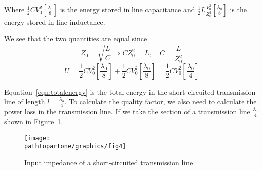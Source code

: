 Where $\frac{1}{2}CV_0^{2}\left[\frac{\lambda_{0}}{8}\right] $ is the energy stored in line capacitance and $ \frac{1}{2}L\frac{V_0^{2}}{Z_0^{2}}\left[ \frac{\lambda_{0}}{8} \right] $ is the energy stored in line inductance.

We see that the two quantities are equal since
\begin{equation*}
Z_0 = \sqrt{\frac{L}{C}}\Longrightarrow CZ_0^{2} = L,\quad C = \frac{L}{Z_0^{2}}
\end{equation*}
\begin{dmath}
U = \frac{1}{2}CV_0^{2}\left[\frac{\lambda_{0}}{8}\right] +\frac{1}{2}CV_0^{2}\left[\frac{\lambda_{0}}{8}\right]
= \frac{1}{2}CV_0^{2}\left[\frac{\lambda_{0}}{4}\right]
\label{eqn:totalenergy}
\end{dmath}

Equation~\eqref{eqn:totalenergy} is the total energy in the short-circuited transmission line of length $l = \frac{\lambda_o}{4}$. To calculate the quality factor, we also need to calculate the power loss in the transmission line. If we take the section of a transmission line $\frac{\lambda_{0}}{4}$ shown in Figure~\ref{fig:fig4}.
\begin{figure}[h]
\centering
\texttt{[image: \\pathtopartone/graphics/fig4]}
\caption{Input impedance of a short-circuited transmission line}
\label{fig:fig4}
\end{figure}

